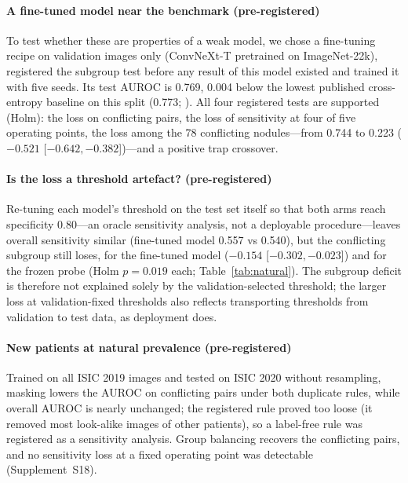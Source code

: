 \paragraph{A fine-tuned model near the benchmark (pre-registered)} To test whether these are properties of a weak
model, we chose a fine-tuning recipe on validation images only (ConvNeXt-T pretrained on ImageNet-22k), registered the
subgroup test before any result of this model existed and trained it with five seeds. Its test AUROC is 0.769, 0.004
below the lowest published cross-entropy baseline on this split (0.773; \citealp{gong2022acl}). All four registered
tests are supported (Holm): the loss on conflicting pairs, the loss of sensitivity at four of five operating points,
the loss among the 78 conflicting nodules---from 0.744 to 0.223 ($-0.521$ [$-0.642, -0.382$])---and a positive trap
crossover.

\paragraph{Is the loss a threshold artefact? (pre-registered)} Re-tuning each model's threshold on the test set
itself so that both arms reach specificity 0.80---an oracle sensitivity analysis, not a deployable procedure---leaves
overall sensitivity similar (fine-tuned model 0.557 vs 0.540), but the conflicting subgroup still loses, for the
fine-tuned model ($-0.154$ [$-0.302, -0.023$]) and for the frozen probe (Holm $p=0.019$ each; Table~\ref{tab:natural}).
The subgroup deficit is therefore not explained solely by the validation-selected threshold; the larger loss at
validation-fixed thresholds also reflects transporting thresholds from validation to test data, as deployment does.

\paragraph{New patients at natural prevalence (pre-registered)} Trained on all ISIC 2019 images and tested on ISIC 2020
without resampling, masking lowers the AUROC on conflicting pairs under both duplicate rules, while overall AUROC is
nearly unchanged; the registered rule proved too loose (it removed most look-alike images of other patients), so a
label-free rule was registered as a sensitivity analysis. Group balancing recovers the conflicting pairs, and no
sensitivity loss at a fixed operating point was detectable (Supplement~S18).
